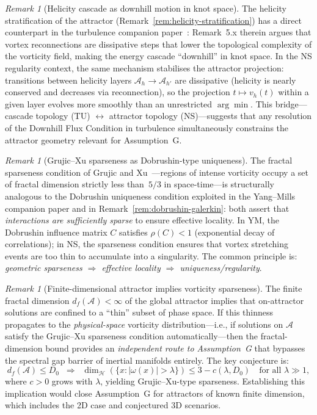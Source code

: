 \documentclass[12pt,a4paper]{article}
\theoremstyle{definition}
\theoremstyle{plain}
\theoremstyle{remark}
\newtheorem{remark}[definition]{Remark}
\begin{document}
\begin{remark}[Helicity cascade as downhill motion in knot space]
\label{rem:helicity-cascade-bridge}
The helicity stratification of the attractor
(Remark~\ref{rem:helicity-stratification}) has a direct counterpart in
the turbulence companion paper~\cite{FST-TU2026}: Remark~5.x therein
argues that vortex reconnections are dissipative steps that lower the
topological complexity of the vorticity field, making the energy cascade
``downhill'' in knot space. In the NS regularity context, the same
mechanism stabilises the attractor projection: transitions between
helicity layers $\mathcal{A}_h \to \mathcal{A}_{h'}$ are dissipative
(helicity is nearly conserved and decreases via reconnection), so the
projection $t \mapsto v_h(t)$ within a given layer evolves more
smoothly than an unrestricted $\arg\min$.  This bridge---cascade
topology (TU) $\leftrightarrow$ attractor topology (NS)---suggests
that any resolution of the Downhill Flux Condition in turbulence
simultaneously constrains the attractor geometry relevant for
Assumption~G\@.
\end{remark}

\begin{remark}[Grujic--Xu sparseness as Dobrushin-type uniqueness]
\label{rem:sparseness-dobrushin}
The fractal sparseness condition of Grujic and
Xu~\cite{GrujicXu2025}---regions of intense vorticity occupy a set of
fractal dimension strictly less than~$5/3$ in space-time---is
structurally analogous to the Dobrushin uniqueness condition exploited
in the Yang--Mills companion paper and in
Remark~\ref{rem:dobrushin-galerkin}: both assert that \emph{interactions
are sufficiently sparse} to ensure effective locality.  In YM, the
Dobrushin influence matrix $C$ satisfies $\rho(C) < 1$ (exponential
decay of correlations); in NS, the sparseness condition ensures that
vortex stretching events are too thin to accumulate into a singularity.
The common principle is: \emph{geometric sparseness $\Rightarrow$
effective locality $\Rightarrow$ uniqueness/regularity}.
\end{remark}

\begin{remark}[Finite-dimensional attractor implies vorticity sparseness]
\label{rem:attractor-sparseness}
The finite fractal dimension $d_f(\mathcal{A}) < \infty$ of the global
attractor implies that on-attractor solutions are confined to a
``thin'' subset of phase space. If this thinness propagates to the
\emph{physical-space} vorticity distribution---i.e., if solutions on
$\mathcal{A}$ satisfy the Grujic--Xu sparseness condition
automatically---then the fractal-dimension bound provides an
\emph{independent route to Assumption~G} that bypasses the spectral gap
barrier of inertial manifolds entirely.  The key conjecture is:
\[
  d_f(\mathcal{A}) \leq D_0
  \;\;\Longrightarrow\;\;
  \dim_{\mathcal{H}}(\{x : |\omega(x)| > \lambda\})
  \leq 3 - c(\lambda, D_0)
  \quad\text{for all } \lambda \gg 1,
\]
where $c > 0$ grows with $\lambda$, yielding Grujic--Xu-type sparseness.
Establishing this implication would close Assumption~G for attractors of
known finite dimension, which includes the 2D case and conjectured
3D scenarios.
\end{remark}
\end{document}
